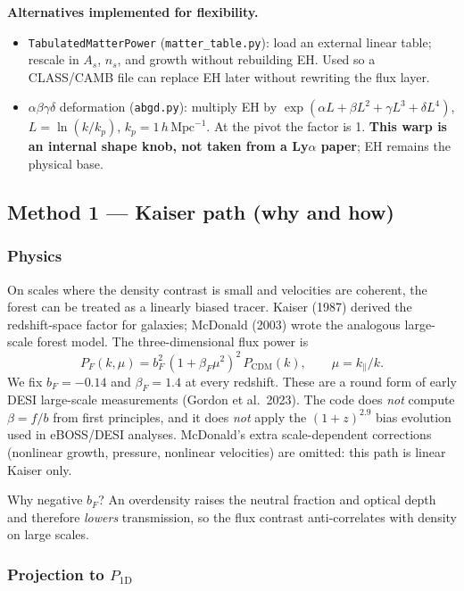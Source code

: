 \documentclass[11pt]{article}
\begin{document}
\textbf{Alternatives implemented for flexibility.}
\begin{itemize}
\item \texttt{TabulatedMatterPower} (\texttt{matter\_table.py}): load an external linear table; rescale in $A_s$, $n_s$, and growth without rebuilding EH.
Used so a CLASS/CAMB file can replace EH later without rewriting the flux layer.
\item $\alpha\beta\gamma\delta$ deformation (\texttt{abgd.py}): multiply EH by
$\exp(\alpha L+\beta L^{2}+\gamma L^{3}+\delta L^{4})$, $L=\ln(k/k_p)$, $k_p=1\,h\,\mathrm{Mpc}^{-1}$.
At the pivot the factor is 1.
\textbf{This warp is an internal shape knob, not taken from a Ly$\alpha$ paper}; EH remains the physical base.
\end{itemize}

\subsection{Method 1 --- Kaiser path (why and how)}

\subsubsection{Physics}

On scales where the density contrast is small and velocities are coherent, the forest can be treated as a linearly biased tracer.
Kaiser (1987) derived the redshift-space factor for galaxies; McDonald (2003) wrote the analogous large-scale forest model.
The three-dimensional flux power is
\begin{equation}
P_F(k,\mu)=b_F^{2}\,(1+\beta_F\mu^{2})^{2}\,P_\mathrm{CDM}(k),
\qquad\mu=k_\parallel/k.
\end{equation}
We fix $b_F=-0.14$ and $\beta_F=1.4$ at every redshift.
These are a round form of early DESI large-scale measurements (Gordon et al.\ 2023).
The code does \emph{not} compute $\beta=f/b$ from first principles, and it does \emph{not} apply the $(1+z)^{2.9}$ bias evolution used in eBOSS/DESI analyses.
McDonald's extra scale-dependent corrections (nonlinear growth, pressure, nonlinear velocities) are omitted: this path is linear Kaiser only.

Why negative $b_F$?
An overdensity raises the neutral fraction and optical depth and therefore \emph{lowers} transmission, so the flux contrast anti-correlates with density on large scales.

\subsubsection{Projection to $P_{1\mathrm{D}}$}
\end{document}
